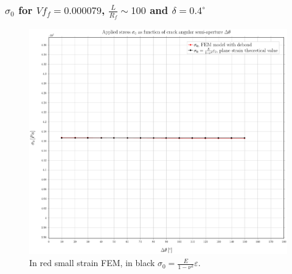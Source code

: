 \documentclass[first,firstsupp,lastsupp,handout,last,hyperref,table]{ETHclass}
\begin{document}
\begin{frame}
\frametitle{\small $\sigma_{0}$ for $Vf_{f}=0.000079$, $\frac{L}{R_{f}}\sim100$ and $\delta=0.4^{\circ}$}
\vspace{-0.5cm}
\centering
\captionsetup[figure]{font=scriptsize,labelfont=scriptsize}
\begin{figure}[!h]
\centering
\includegraphics[height=0.7\textheight]{2017-06-16_AbqRunSummary_SingleFiberEqRfSmallStrain-D0-4_sigma-inf_Summary.pdf}
  \caption{\scriptsize In red small strain FEM, in black $\sigma_{0}=\frac{E}{1-\nu^{2}}\varepsilon$.}
  \label{fig:res1}
\end{figure}
\end{frame}
\end{document}
